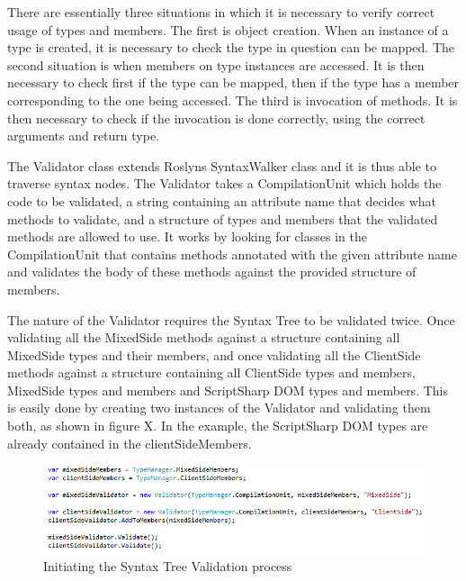 		There are essentially three situations in which it is necessary to verify correct usage of types and members. The first is object creation. When an instance of a type is created, it is necessary to check the type in question can be mapped. The second situation is when members on type instances are accessed. It is then necessary to check first if the type can be mapped, then if the type has a member corresponding to the one being accessed. The third is invocation of methods. It is then necessary to check if the invocation is done correctly, using the correct arguments and return type.

		The Validator class extends Roslyns SyntaxWalker class and it is thus able to traverse syntax nodes. The Validator takes a CompilationUnit which holds the code to be validated, a string containing an attribute name that decides what methods to validate, and a structure of types and members that the validated methods are allowed to use. It works by looking for classes in the CompilationUnit that contains methods annotated with the given attribute name and validates the body of these methods against the provided structure of members.

		The nature of the Validator requires the Syntax Tree to be validated twice. Once validating all the MixedSide methods against a structure containing all MixedSide types and their members, and once validating all the ClientSide methods against a structure containing all ClientSide types and members, MixedSide types and members and ScriptSharp DOM types and members. This is easily done by creating two instances of the Validator and validating them both, as shown in figure X. In the example, the ScriptSharp DOM types are already contained in the clientSideMembers. 

		\begin{figure}[H]
			\begin{center}
				\centerline{\includegraphics[width=14cm]{resources/images/validatorInitiation.png}}
			\end{center}
			\caption{Initiating the Syntax Tree Validation process}
			\label{validatorInitiation}
		\end{figure}

